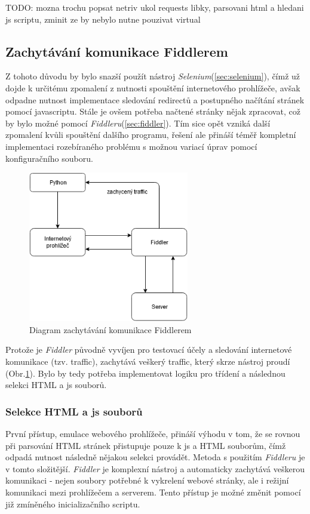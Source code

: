 \documentclass[thesis=M,czech,hidelinks]{FITthesis}[2013/05/06]
\begin{document}
TODO: mozna trochu popsat netriv ukol requests libky, parsovani html a hledani js scriptu, zminit ze by nebylo nutne pouzivat virtual

\subsection{Zachytávání komunikace Fiddlerem}
Z tohoto důvodu by bylo snazší použít nástroj \textit{Selenium}(\ref{sec:selenium}), čímž už dojde k určitému zpomalení z nutnosti spouštění internetového prohlížeče, avšak odpadne nutnost implementace sledování redirectů a postupného načítání stránek pomocí javascriptu. Stále je ovšem potřeba načtené stránky nějak zpracovat, což by bylo možné pomocí \textit{Fiddleru}(\ref{sec:fiddler}). Tím sice opět vzniká další zpomalení kvůli spouštění dalšího programu, řešení ale přináší téměř kompletní implementaci rozebíraného problému s možnou variací úprav pomocí konfiguračního souboru.
\begin{figure}[h]
	\centering
	\includegraphics[width=7cm]{pictures/fiddler_diagram.png}
	\caption{Diagram zachytávání komunikace Fiddlerem}
	\label{fig:fiddler}
\end{figure}
Protože je \textit{Fiddler} původně vyvíjen pro testovací účely a sledování internetové komunikace (tzv. traffic), zachytává veškerý traffic, který skrze nástroj proudí (Obr.\ref{fig:fiddler}). Bylo by tedy potřeba implementovat logiku pro třídení a následnou selekci HTML a js souborů.

\subsubsection{Selekce HTML a js souborů}
První přístup, emulace webového prohlížeče, přináší výhodu v tom, že se rovnou při parsování HTML stránek přistupuje pouze k js a HTML souborům, čímž odpadá nutnost následně nějakou selekci provádět. Metoda s použitím \textit{Fiddleru} je v tomto složitější. \textit{Fiddler} je komplexní nástroj a automaticky zachytává veškerou komunikaci - nejen soubory potřebné k vykrelení webové stránky, ale i režijní komunikaci mezi prohlížečem a serverem. Tento přístup je možné změnit pomocí již zmíněného inicializačního scriptu. 
\end{document}
